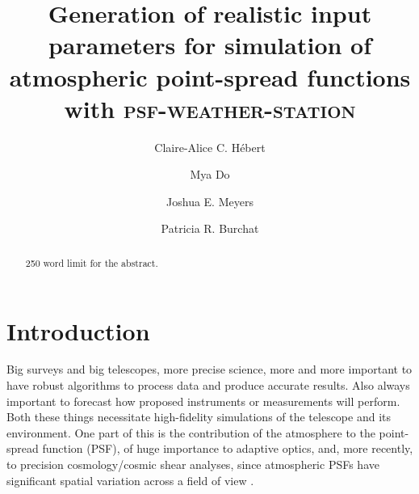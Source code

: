 \documentclass[twocolumn]{aastex631}
\newcommand{\psfws}{\textsc{psf-weather-station}\xspace}
\begin{document}
\title{Generation of realistic input parameters for simulation of atmospheric point-spread functions with \psfws}



\author[0000-0002-7397-2690]{Claire-Alice C. H\'ebert}

\author{Mya Do}

\author{Joshua E. Meyers}

\author{Patricia R. Burchat}


\begin{abstract}
250 word limit for the abstract. 
\end{abstract}

\section{Introduction} \label{sec:intro}
Big surveys and big telescopes, more precise science, more and more important to have robust algorithms to process data and produce accurate results. 
Also always important to forecast how proposed instruments or measurements will perform. 
Both these things necessitate high-fidelity simulations of the telescope and its environment. 
One part of this is the contribution of the atmosphere to the point-spread function (PSF), of huge importance to adaptive optics, and, more recently, to precision cosmology/cosmic shear analyses, since atmospheric PSFs have significant spatial variation across a field of view \citep{jarvis_science_2016, heymans_impact_2012}.
\end{document}
